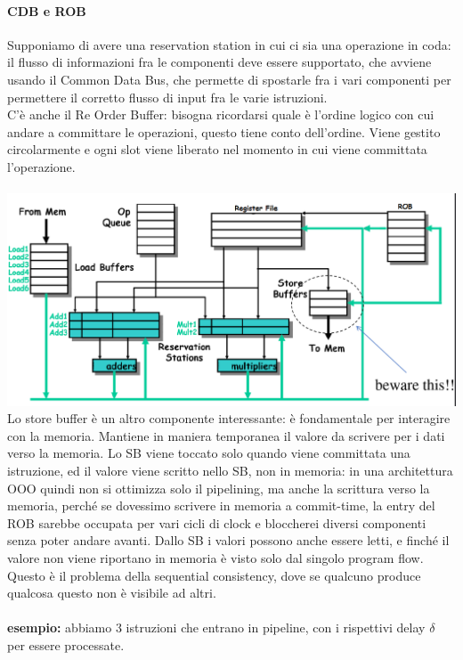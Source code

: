 \documentclass[14pt]{article}
\begin{document}
\paragraph{CDB e ROB}
Supponiamo di avere una reservation station in cui ci sia una operazione in coda: il flusso di informazioni fra le componenti deve essere supportato, che avviene usando il Common Data Bus, che permette di spostarle fra i vari componenti per permettere il corretto flusso di input fra le varie istruzioni.\\ C'è anche il Re Order Buffer: bisogna ricordarsi quale è l'ordine logico con cui andare a committare le operazioni, questo tiene conto dell'ordine. Viene gestito circolarmente e ogni slot viene liberato nel momento in cui viene committata l'operazione.
\\\\
\includegraphics[scale=0.25]{immagini/arch-moderna}\\
Lo store buffer è un altro componente interessante: è fondamentale per interagire con la memoria. Mantiene in maniera temporanea il valore da scrivere per i dati verso la memoria. Lo SB viene toccato solo quando viene committata una istruzione, ed il valore viene scritto nello SB, non in memoria: in una architettura OOO quindi non si ottimizza solo il pipelining, ma anche la scrittura verso la memoria, perché se dovessimo scrivere in memoria a commit-time, la entry del ROB sarebbe occupata per vari cicli di clock e bloccherei diversi componenti senza poter andare avanti. Dallo SB i valori possono anche essere letti, e finché il valore non viene riportano in memoria è visto solo dal singolo program flow. Questo è il problema della sequential consistency, dove se qualcuno produce qualcosa questo non è visibile ad altri.\\\\ \textbf{esempio:} abbiamo 3 istruzioni che entrano in pipeline, con i rispettivi delay $\delta$ per essere processate.
\end{document}
